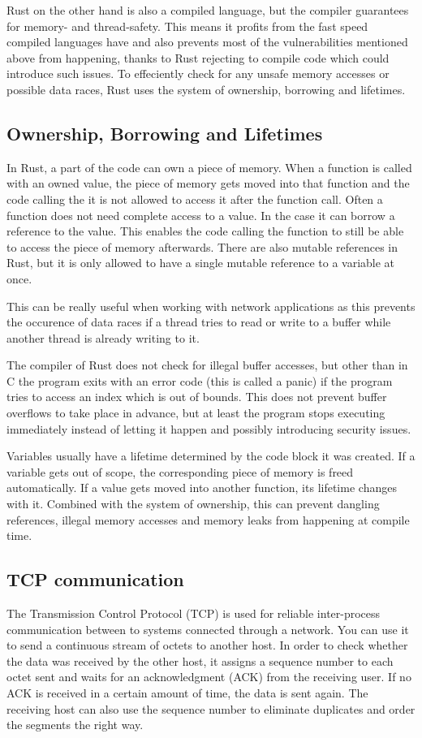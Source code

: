 Rust on the other hand is also a compiled language, but the compiler guarantees for memory- and thread-safety. This
means it profits from the fast speed compiled languages have and also prevents most of the vulnerabilities mentioned
above from happening, thanks to Rust rejecting to compile code which could introduce such issues. To effeciently check
for any unsafe memory accesses or possible data races, Rust uses the system of ownership, borrowing and lifetimes.

\subsection{Ownership, Borrowing and Lifetimes}
In Rust, a part of the code can own a piece of memory. When a function is called with an owned value, the piece of
memory gets moved into that function and the code calling the it is not allowed to access it after the function call.
Often a function does not need complete access to a value. In the case it can borrow a reference to the value. This
enables the code calling the function to still be able to access the piece of memory afterwards. There are also mutable
references in Rust, but it is only allowed to have a single mutable reference to a variable at once.

This can be really useful when working with network applications as this prevents the occurence of data races if a
thread tries to read or write to a buffer while another thread is already writing to it.

The compiler of Rust does not check for illegal buffer accesses, but other than in C the program exits with an error
code (this is called a panic) if the program tries to access an index which is out of bounds. This does not prevent
buffer overflows to take place in advance, but at least the program stops executing immediately instead of letting it
happen and possibly introducing security issues.

Variables usually have a lifetime determined by the code block it was created. If a variable gets out of scope, the
corresponding piece of memory is freed automatically. If a value gets moved into another function, its lifetime changes
with it. Combined with the system of ownership, this can prevent dangling references, illegal memory accesses and
memory leaks from happening at compile time. \cite{c15safe}

\subsection{TCP communication}
The Transmission Control Protocol (TCP) is used for reliable inter-process communication between to systems connected
through a network. You can use it to send a continuous stream of octets to another host. In order to check whether the
data was received by the other host, it assigns a sequence number to each octet sent and waits for an acknowledgment
(ACK) from the receiving user. If no ACK is received in a certain amount of time, the data is sent again. The receiving
host can also use the sequence number to eliminate duplicates and order the segments the right way. \cite{RFC0793}

